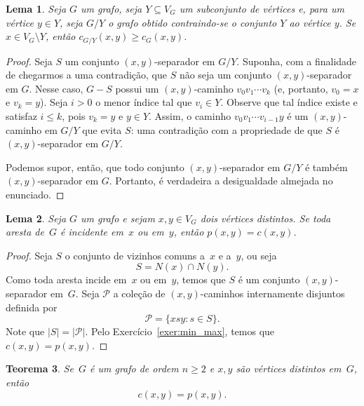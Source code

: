 \documentclass[12pt, a4paper]{article}
\newtheorem{teor}{Teorema}[section]
\newtheorem{lema}[teor]{Lema}
\theoremstyle{definition}
\begin{document}
\begin{lema}
\label{lema:c_contracted}
Seja $G$ um grafo, seja $Y \subseteq V_G$ um subconjunto de vértices e, para um vértice $y \in Y$, seja $G/Y$ o grafo obtido contraindo-se o conjunto $Y$ ao vértice $y$. Se $x \in V_G \setminus Y$, então $c_{G/Y}(x,y) \geq c_G(x,y)$.
\end{lema}

\begin{proof}
  Seja $S$ um conjunto $(x,y)$-separador em $G/Y$. Suponha, com a finalidade de chegarmos a uma contradição, que $S$ não seja um conjunto $(x,y)$-separador em $G$. Nesse caso, $G - S$ possui um $(x,y)$-caminho $v_0 v_1 \cdots v_k$ (e, portanto, $v_0 = x$ e $v_k = y$). Seja $i > 0$ o menor índice tal que $v_i \in Y$. Observe que tal índice existe e satisfaz $i \leq k$, pois $v_k = y$ e $y \in Y$. Assim, o caminho $v_0 v_1 \cdots v_{i-1} y$ é um $(x,y)$-caminho em $G/Y$ que evita $S$: uma contradição com a propriedade de que $S$ é $(x,y)$-separador em $G/Y$. 

Podemos supor, então, que todo conjunto $(x,y)$-separador em $G/Y$ é também $(x,y)$-separador em $G$. Portanto, é verdadeira a desigualdade almejada no enunciado.
\end{proof}

\begin{lema}
\label{lema:all_paths_size_2}
Seja $G$ um grafo e sejam $x,y \in V_G$ dois vértices distintos. Se toda aresta de~$G$ é incidente em~$x$ ou em~$y$, então $p(x,y) = c(x,y)$.
\end{lema}

\begin{proof}
Seja $S$ o conjunto de vizinhos comuns a~$x$ e a~$y$, ou seja
\[ S = N(x) \cap N(y). \]
Como toda aresta incide em~$x$ ou em~$y$, temos que $S$ é um conjunto $(x,y)$-separador em~$G$. Seja $\mathcal{P}$ a coleção de $(x,y)$-caminhos internamente disjuntos definida por
\[ \mathcal{P} = \{xsy \colon s \in S\}. \]
Note que $|S| = |\mathcal{P}|$. Pelo Exercício~\ref{exer:min_max}, temos que $c(x,y) = p(x,y)$.
\end{proof}


\begin{teor}
\label{teor:menger}
Se~$G$ é um grafo de ordem $n \geq 2$ e $x,y$ são vértices distintos em~$G$, então
\begin{equation}
  \label{eq:min_max_conn2}
  c(x,y) = p(x,y).
\end{equation}
\end{teor}
\end{document}
